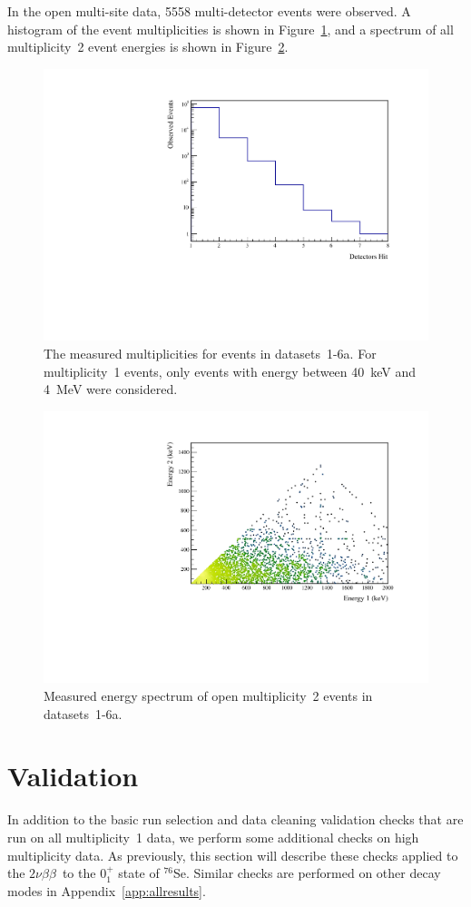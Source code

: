 \documentclass[notitlepage,rmp,aps,10pt]{revtex4-1}
\newcommand{\tnbb}{${2 \nu \beta \beta}$}
\newcommand{\iso}[2]{$^{#1}$#2}
\newcommand{\Se}[1]{\iso{#1}{Se}}
\newcommand{\SP}[3]{$#1^{#2}_{#3}$}
\begin{document}
In the open multi-site data, 5558 multi-detector events were observed.
A histogram of the event multiplicities is shown in Figure~\ref{fig:datamult}, and a spectrum of all multiplicity~2 event energies is shown in Figure~\ref{fig:data2D}.
\begin{figure}[h]
  \centering
  \includegraphics[width=.6\linewidth]{DataMultiplicity}
  \caption[Measured event multiplicities]{\label{fig:datamult}
    The measured multiplicities for events in datasets~1-6a. For multiplicity~1 events, only events with energy between 40~keV and 4~MeV were considered.
  }
\end{figure}
\begin{figure}[h]
  \centering
  \includegraphics[width=.8\linewidth]{Data2D}
  \caption[Measured energy spectrum of multiplicity~2 events]{\label{fig:data2D}
    Measured energy spectrum of open multiplicity~2 events in datasets~1-6a.
  }
\end{figure}

\section{Validation}
In addition to the basic run selection and data cleaning validation checks that are run on all multiplicity~1 data, we perform some additional checks on high multiplicity data.
As previously, this section will describe these checks applied to the \tnbb\ to the \SP{0}{+}{1} state of \Se{76}.
Similar checks are performed on other decay modes in Appendix~\ref{app:allresults}.
\end{document}
